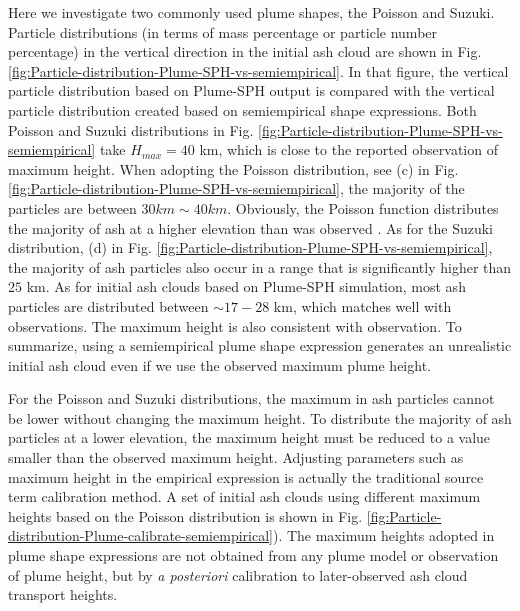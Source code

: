 \documentclass[utf8]{frontiersSCNS} %
\begin{document}
Here we investigate two commonly used plume shapes, the Poisson and Suzuki.
Particle distributions (in terms of mass percentage or particle number percentage) in the vertical direction in the initial ash cloud are shown in Fig. \ref{fig:Particle-distribution-Plume-SPH-vs-semiempirical}. In that figure, the vertical particle distribution based on Plume-SPH output is compared with the vertical particle distribution created based on semiempirical shape expressions. Both Poisson and Suzuki distributions in Fig. \ref{fig:Particle-distribution-Plume-SPH-vs-semiempirical} take $H_{max} = 40$ km, which is close to the reported observation of maximum height. When adopting the Poisson distribution, see (c) in  Fig. \ref{fig:Particle-distribution-Plume-SPH-vs-semiempirical}, the majority of the particles are between $30 km \sim 40 km$. Obviously, the Poisson function distributes the majority of ash at a higher elevation than was observed \citep[e.g.][]{fero2008simulation}. As for the Suzuki distribution, (d) in  Fig. \ref{fig:Particle-distribution-Plume-SPH-vs-semiempirical}, the majority of ash particles also occur in a range that is significantly higher than $25 $ km. As for initial ash clouds based on Plume-SPH simulation, most ash particles are distributed between $\sim 17-  28$ km, which matches well with observations. The maximum height is also consistent with observation. To summarize, using a semiempirical plume shape expression generates an unrealistic initial ash cloud even if we use the observed maximum plume height.

For the Poisson and Suzuki distributions, the maximum in ash particles cannot be lower without changing the maximum height. To distribute the majority of ash particles at a lower elevation, the maximum height must be reduced to a value smaller than the observed maximum height. Adjusting parameters such as maximum height in the empirical expression is actually the traditional source term calibration method. A set of initial ash clouds using different maximum heights based on the Poisson distribution is shown in Fig. \ref{fig:Particle-distribution-Plume-calibrate-semiempirical}). The maximum heights adopted in plume shape expressions are not obtained from any plume model or observation of plume height, but by \textit{a posteriori} calibration to later-observed ash cloud transport heights.
\end{document}

